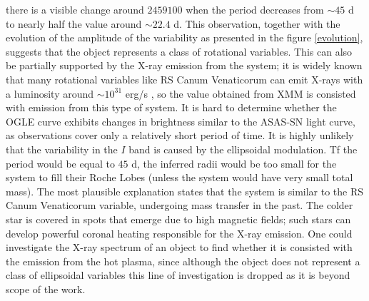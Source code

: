 \documentclass{pracalicmgr}
\begin{document}
there is a visible change around $2459100$ when the period decreases from $\sim 45$ d to nearly half the value around $\sim22.4$ d.
This observation, together with the evolution of the amplitude of the variability as presented in the figure \ref{evolution},
suggests that the object represents a class of rotational variables.
This can also be partially supported by the X-ray emission from the system; it is widely known that many rotational variables like RS Canum Venaticorum can
emit X-rays with a luminosity around $\sim 10^{31}$ erg/s \citep{walter_x-rays_1980}, so the value obtained from XMM 
is consisted with emission from this type of system. It is hard to determine whether the OGLE curve exhibits changes in brightness similar to the ASAS-SN light curve,
as observations cover only a relatively short period of time. 
It is highly unlikely that the variability in the $I$ band is caused by the ellipsoidal modulation.
Tf the period would be equal to $45$ d, the inferred radii would be too small for the system to fill their Roche Lobes (unless the system would have very small total mass).
The most plausible explanation states that the system is similar to the RS Canum Venaticorum variable, undergoing mass transfer in the past.
The colder star is covered in spots that emerge due to high magnetic fields; such stars can develop powerful coronal heating responsible for the X-ray emission.
One could investigate the X-ray spectrum of an object to find whether it is consisted with the emission from the hot plasma,
since although the object does not represent a class of ellipsoidal variables this line of investigation is dropped as it is beyond
scope of the work.%
\end{document}
